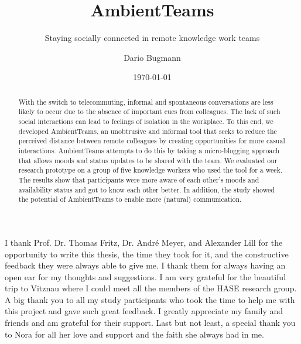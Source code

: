 \documentclass{seal_thesis}
\date{\today}
\title{AmbientTeams}
\subtitle{Staying socially connected in remote knowledge work teams}
\author{Dario Bugmann}
\begin{document}
\maketitle

\frontmatter

\begin{acknowledgements}
    I thank Prof. Dr. Thomas Fritz, Dr. André Meyer, and Alexander Lill for the opportunity to write this thesis, the time they took for it, and the constructive feedback they were always able to give me. I thank them for always having an open ear for my thoughts and suggestions. I am very grateful for the beautiful trip to Vitznau where I could meet all the members of the HASE research group. A big thank you to all my study participants who took the time to help me with this project and gave such great feedback. I greatly appreciate my family and friends and am grateful for their support. Last but not least, a special thank you to Nora for all her love and support and the faith she always had in me.
\end{acknowledgements}

\begin{abstract}
    With the switch to telecommuting, informal and spontaneous conversations are less likely to occur due to the absence of important cues from colleagues. The lack of such social interactions can lead to feelings of isolation in the workplace. To this end, we developed AmbientTeams, an unobtrusive and informal tool that seeks to reduce the perceived distance between remote colleagues by creating opportunities for more casual interactions. AmbientTeams attempts to do this by taking a micro-blogging approach that allows moods and status updates to be shared with the team. We evaluated our research prototype on a group of five knowledge workers who used the tool for a week. The results show that participants were more aware of each other's moods and availability status and got to know each other better. In addition, the study showed the potential of AmbientTeams to enable more (natural) communication.
\end{abstract}
\end{document}
